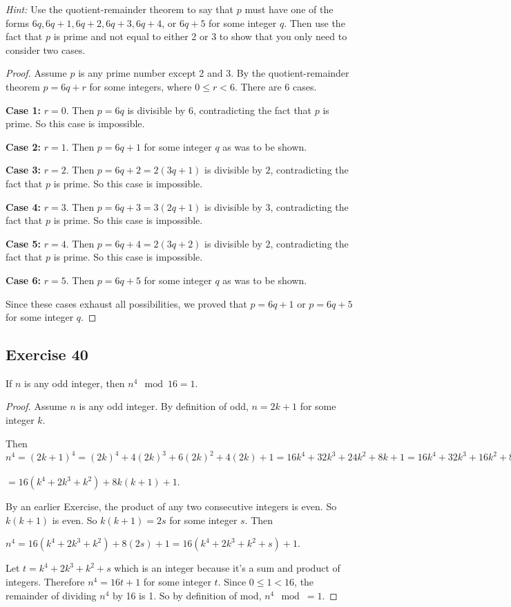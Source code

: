\documentclass[14pt]{extarticle}
\begin{document}
{\it Hint:} Use the quotient-remainder theorem to say that $p$ must have one of the forms $6q, 6q + 1, 6q + 2, 6q + 3, 6q + 4$, or $6q + 5$ for some integer $q$. Then use the fact that $p$ is prime and not equal to either 2 or 3 to show that you only need to consider two cases.

\begin{proof}
Assume $p$ is any prime number except 2 and 3. By the quotient-remainder theorem $p = 6q+r$ for some integers, where $0 \leq r < 6$. There are 6 cases.

{\bf Case 1:} $r = 0$. Then $p = 6q$ is divisible by $6$, contradicting the fact that $p$ is prime. So this case is impossible.

{\bf Case 2:} $r = 1$. Then $p = 6q+1$ for some integer $q$ as was to be shown.

{\bf Case 3:} $r = 2$. Then $p = 6q+2 = 2(3q+1)$ is divisible by $2$, contradicting the fact that $p$ is prime. So this case is impossible.

{\bf Case 4:} $r = 3$. Then $p = 6q+3 = 3(2q+1)$ is divisible by $3$, contradicting the fact that $p$ is prime. So this case is impossible.

{\bf Case 5:} $r = 4$. Then $p = 6q+4 = 2(3q+2)$ is divisible by $2$, contradicting the fact that $p$ is prime. So this case is impossible.

{\bf Case 6:} $r = 5$. Then $p = 6q+5$ for some integer $q$ as was to be shown.

Since these cases exhaust all possibilities, we proved that $p = 6q+1$ or $p = 6q+5$ for some integer $q$.
\end{proof}

\subsection{Exercise 40}
If $n$ is any odd integer, then $n^4 \mod 16 = 1$.

\begin{proof}
Assume $n$ is any odd integer. By definition of odd, $n = 2k+1$ for some integer $k$.

Then $n^4 = (2k+1)^4 = (2k)^4 + 4(2k)^3 + 6(2k)^2 + 4(2k) + 1 = 16k^4 + 32k^3 + 24k^2 + 8k + 1 = 16k^4 + 32k^3 + 16k^2 + 8k^2 + 8k + 1 = 16(k^4 + 2k^3+ k^2) + 8k^2 + 8k + 1$

$= 16(k^4 + 2k^3+ k^2) + 8k(k + 1) + 1$.

By an earlier Exercise, the product of any two consecutive integers is even. So $k(k+1)$ is even. So $k(k+1) = 2s$ for some integer $s$. Then

$n^4 = 16(k^4 + 2k^3+ k^2) + 8(2s) + 1 = 16(k^4 + 2k^3+ k^2 + s) + 1$.

Let $t = k^4 + 2k^3+ k^2 + s$ which is an integer because it's a sum and product of integers. Therefore $n^4 = 16t + 1$ for some integer $t$. Since $0 \leq 1 < 16$, the remainder of dividing $n^4$ by 16 is 1. So by definition of mod, $n^4 \mod = 1$.
\end{proof}
\end{document}
